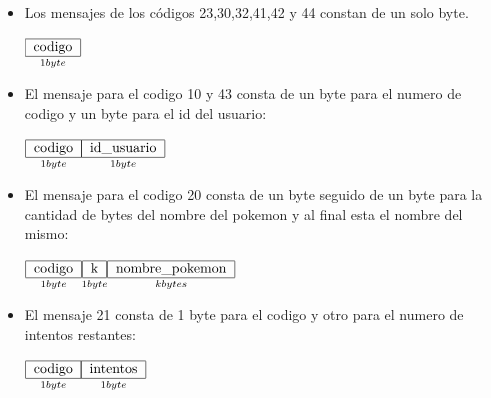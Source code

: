 \documentclass[11pt,letterpaper]{article}
\begin{document}
\begin{itemize}
	\item Los mensajes de los códigos 23,30,32,41,42 y 44 constan de un solo byte.
	
	$\underset{1 byte}{\begin{tabular}{|c|}
		\hline 
		codigo \\ 
		\hline 
		\end{tabular}} $
	
	\item El mensaje para el codigo 10 y 43 consta de un byte para el numero de codigo y un byte para el id del usuario:
	
	$\underset{1 byte}{\begin{tabular}{|c|}
		\hline 
		codigo \\ 
		\hline 
		\end{tabular}}\underset{1 byte}{\begin{tabular}{|c|}
		\hline 
		id\_usuario \\ 
		\hline 
		\end{tabular}} $
	\item El mensaje para el codigo 20 consta de un byte seguido de un byte para la cantidad de bytes del nombre del pokemon y al final esta el nombre del mismo:
	
	$\underset{1 byte}{\begin{tabular}{|c|}
		\hline 
		codigo \\ 
		\hline 
		\end{tabular}}\underset{1 byte}{\begin{tabular}{|c|}
		\hline 
		k \\ 
		\hline 
		\end{tabular}}\underset{k bytes}{\begin{tabular}{|c|}
		\hline 
		nombre\_pokemon \\ 
		\hline 
		\end{tabular}} $
	\item El mensaje 21 consta de 1 byte para el codigo y otro para el numero de intentos restantes:
	
	$\underset{1 byte}{\begin{tabular}{|c|}
		\hline 
		codigo \\ 
		\hline 
		\end{tabular}}\underset{1 byte}{\begin{tabular}{|c|}
		\hline 
		intentos \\ 
		\hline 
		\end{tabular}} $
	

\end{itemize}
\end{document}
